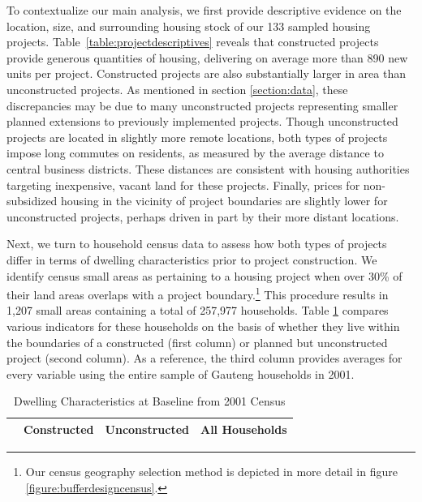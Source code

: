 \documentclass[12pt]{article}
\begin{document}
To contextualize our main analysis, we first provide descriptive evidence on the location, size, and surrounding housing stock of our 133 sampled housing projects. Table~\ref{table:projectdescriptives} reveals that constructed projects provide generous quantities of housing, delivering on average more than 890 new units per project. Constructed projects are also substantially larger in area than unconstructed projects. As mentioned in section \ref{section:data}, these discrepancies may be due to many unconstructed projects representing smaller planned extensions to previously implemented projects. Though unconstructed projects are located in slightly more remote locations, both types of projects impose long commutes on residents, as measured by the average distance to central business districts. These distances are consistent with housing authorities targeting inexpensive, vacant land for these projects. Finally, prices for non-subsidized housing in the vicinity of project boundaries are slightly lower for unconstructed projects, perhaps driven in part by their more distant locations.


Next, we turn to household census data to assess how both types of projects differ in terms of dwelling characteristics prior to project construction. We identify census small areas as pertaining to a housing project when over 30\% of their land areas overlaps with a project boundary.\footnote{Our census geography selection method is depicted in more detail in figure \ref{figure:bufferdesigncensus}.} This procedure results in 1,207 small areas containing a total of 257,977 households. Table \ref{table:projectdescriptivescensus} compares various indicators for these households on the basis of whether they live within the boundaries of a constructed (first column) or planned but unconstructed project (second column). As a reference, the third column provides averages for every variable using the entire sample of Gauteng households in 2001. 
 

\begin{table}[t!]
	\centering
	\caption{Dwelling Characteristics at Baseline from 2001 Census}\label{table:projectdescriptivescensus}
\vspace{-2mm}
\begin{tabular}{l*{1}{ccc}}
\toprule
& Constructed & Unconstructed & All Households \\
\midrule
 
\bottomrule
\end{tabular}
\end{table}
\end{document}
